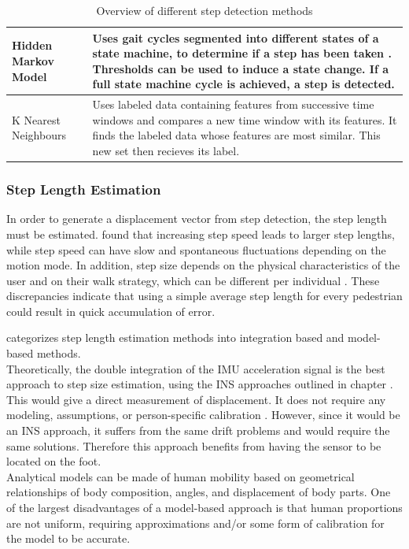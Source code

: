 \begin{table}[h]
\begin{tabularx}{\linewidth}{@{} P{17mm} L}
  Hidden Markov Model & Uses gait cycles segmented into different states of a state machine, to determine if a step has been taken \cite{Ren2016a}. Thresholds can be used to induce a state change. If a full state machine cycle is achieved, a step is detected.\\ \hline
  K Nearest Neighbours & Uses labeled data containing features from successive time windows and compares a new time window with its features. It finds the labeled data whose features are most similar. This new set then recieves its label. \\
			\bottomrule
\end{tabularx}
		\caption{Overview of different step detection methods}
		\label{tab:step_detection_comparison}
\end{table}
\restoregeometry


\subsubsection{Step Length Estimation}
In order to generate a displacement vector from step detection, the step length must be estimated. \citet{Collins2013a} found that increasing step speed leads to larger step lengths, while step speed can have slow and spontaneous fluctuations depending on the motion mode. In addition, step size depends on the physical characteristics of the user and on their walk strategy, which can be different per individual \cite{Diez2018}. These discrepancies indicate that using a simple average step length for every pedestrian could result in quick accumulation of error. 

\citet{Diez2018} categorizes step length estimation methods into integration based and model-based methods. \\
Theoretically, the double integration of the IMU acceleration signal is the best approach to step size estimation, using the INS approaches outlined in chapter . This would give a direct measurement of displacement. It does not require any modeling, assumptions, or person-specific calibration \cite{Diez2018}. However, since it would be an INS approach, it suffers from the same drift problems and would require the same solutions. Therefore this approach benefits from having the sensor to be located on the foot. \\
Analytical models can be made of human mobility based on geometrical relationships of body composition, angles, and displacement of body parts. One of the largest disadvantages of a model-based approach is that human proportions are not uniform, requiring approximations and/or some form of calibration for the model to be accurate.


